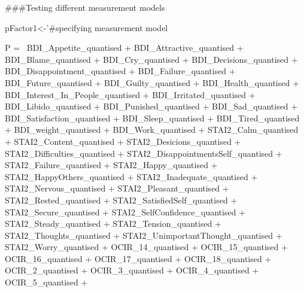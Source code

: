 \documentclass[]{article}
\newenvironment{Shaded}{\begin{snugshade}}{\end{snugshade}}
\newcommand{\StringTok}[1]{\textcolor[rgb]{0.31,0.60,0.02}{#1}}
\newcommand{\NormalTok}[1]{#1}
\begin{document}
\begin{Shaded}
\begin{Highlighting}[]
\NormalTok{###Testing different measurement models}

\NormalTok{pFactor1<-}\StringTok{'#specifying measurement model}

\StringTok{P   =~ BDI_Appetite_quantised   + }
\StringTok{       BDI_Attractive_quantised + }
\StringTok{       BDI_Blame_quantised  + }
\StringTok{       BDI_Cry_quantised    +   }
\StringTok{       BDI_Decisions_quantised  +   }
\StringTok{       BDI_Disappointment_quantised +   }
\StringTok{       BDI_Failure_quantised    +   }
\StringTok{       BDI_Future_quantised +   }
\StringTok{       BDI_Guilty_quantised +   }
\StringTok{       BDI_Health_quantised +   }
\StringTok{       BDI_Interest_In_People_quantised +   }
\StringTok{       BDI_Irritated_quantised  +   }
\StringTok{       BDI_Libido_quantised +   }
\StringTok{       BDI_Punished_quantised   +   }
\StringTok{       BDI_Sad_quantised + }
\StringTok{       BDI_Satisfaction_quantised   +   }
\StringTok{       BDI_Sleep_quantised  +   }
\StringTok{       BDI_Tired_quantised  +   }
\StringTok{       BDI_weight_quantised +   }
\StringTok{       BDI_Work_quantised   +}
\StringTok{        STAI2_Calm_quantised +}
\StringTok{        STAI2_Content_quantised +}
\StringTok{        STAI2_Desicions_quantised +}
\StringTok{        STAI2_Difficulties_quantised +}
\StringTok{        STAI2_DisappointmentsSelf_quantised +}
\StringTok{        STAI2_Failure_quantised +}
\StringTok{        STAI2_Happy_quantised +}
\StringTok{        STAI2_HappyOthers_quantised +}
\StringTok{        STAI2_Inadequate_quantised +}
\StringTok{        STAI2_Nervous_quantised +}
\StringTok{        STAI2_Pleasant_quantised +}
\StringTok{        STAI2_Rested_quantised +}
\StringTok{        STAI2_SatisfiedSelf_quantised +}
\StringTok{        STAI2_Secure_quantised +}
\StringTok{        STAI2_SelfConfidence_quantised +}
\StringTok{        STAI2_Steady_quantised +}
\StringTok{        STAI2_Tension_quantised +}
\StringTok{        STAI2_Thoughts_quantised +}
\StringTok{        STAI2_UnimportantThought_quantised +}
\StringTok{        STAI2_Worry_quantised +}
\StringTok{       OCIR_14_quantised    +   }
\StringTok{       OCIR_15_quantised    +   }
\StringTok{       OCIR_16_quantised    +   }
\StringTok{       OCIR_17_quantised    +   }
\StringTok{       OCIR_18_quantised    +   }
\StringTok{       OCIR_2_quantised +   }
\StringTok{       OCIR_3_quantised +   }
\StringTok{       OCIR_4_quantised +   }
\StringTok{       OCIR_5_quantised +   }

\end{Highlighting}
\end{Shaded}
\end{document}
